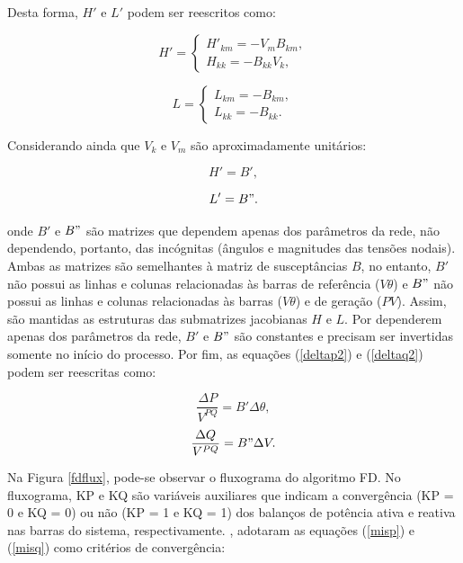 \documentclass[
	12pt,				%
	openany,			%
	twoside,			%
	a4paper,			%
	chapter=TITLE,		%
	section=Title,		%
	subsection=Title,	%
	subsubsection=Title,%
	english,			%
	french,				%
	spanish,			%
	brazil			%
	]{abntex2}
\begin{document}
\begin{ERRATA}
\begin{itemize}
\end{itemize}

Desta forma, $H'$ e $L'$ podem ser reescritos como:

 
\begin{equation}\label{hk'}
H' = 
\begin{cases}
H'_{km} =  -V_{m}B_{km},\\

H_{kk} =  -B_{kk}V_k, \end{cases}
\end{equation}

\begin{equation}\label{lk'}
L = 
\begin{cases}
L_{km} = -B_{km},\\
L_{kk} =  -B_{kk}.
\end{cases}
\end{equation}

Considerando ainda que $V_k$ e $V_m$ são aproximadamente unitários: 

\begin{equation}\label{hk''}
H' = B',
\end{equation}

\begin{equation}\label{lk''}
L' = B".
\end{equation}

\noindent onde $B'$ e $B"$ são matrizes que dependem apenas dos parâmetros da rede, não dependendo, portanto, das incógnitas (ângulos e magnitudes das tensões nodais). Ambas as matrizes são semelhantes à matriz de susceptâncias $B$, no entanto, $B'$ não possui as linhas e colunas relacionadas às barras de referência ($V\theta$) e  $B"$ não possui as linhas e colunas relacionadas às barras ($V\theta$) e de geração ($PV$). Assim, são mantidas as estruturas das submatrizes jacobianas $H$ e $L$. Por dependerem apenas dos parâmetros da rede, $B'$ e $B"$ são constantes e precisam ser invertidas somente no início do processo. Por fim, as equações (\ref{deltap2}) e (\ref{deltaq2}) podem ser reescritas como:

\begin{equation}
\frac{\Delta P}{V^{PQ}} = B'\Delta \theta,
\end{equation}
\begin{equation}
\frac{\Delta Q}{V^{PQ}} = B"\Delta V.
\end{equation}

Na Figura \ref{fdflux}, pode-se observar o fluxograma do algoritmo FD. No fluxograma, KP e KQ são variáveis auxiliares que indicam a convergência (KP = 0 e KQ = 0) ou não (KP = 1 e KQ = 1) dos balanços de potência ativa e reativa nas barras do sistema, respectivamente. , adotaram as equações (\ref{misp}) e (\ref{misq}) como critérios de convergência:


\end{ERRATA}
\end{document}
